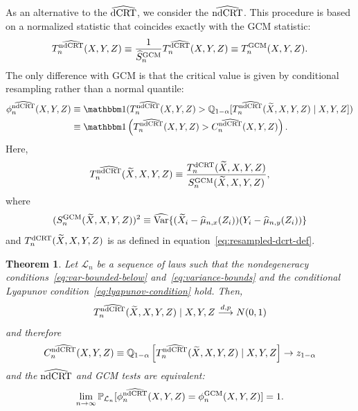 \documentclass[aos]{imsart}
\theoremstyle{plain}
\newtheorem{theorem}{Theorem}
\theoremstyle{remark}
\newcommand{\V}{\mathrm{Var}}							%
\renewcommand{\P}{\mathbb{P}}							%
\newcommand{\Q}{\mathbb{Q}}								%
\newcommand{\indicator}{\mathbbm 1}						%
\newcommand{\srx}{X}									%
\newcommand{\srz}{Z}									%
\newcommand{\srxk}{\widetilde X}						%
\newcommand{\sry}{Y}									%
\newcommand{\law}{\mathcal L}							%
\newcommand{\dCRT}{\textnormal{dCRT}} 					%
\newcommand{\GCM}{\textnormal{GCM}}						%
\newcommand{\dCRThat}{\widehat{\textnormal{dCRT}}}		%
\newcommand{\ndCRThat}{\widehat{\textnormal{ndCRT}}}	%
\newcommand{\convdp}{\overset {d,p} \longrightarrow}    %
\begin{document}
As an alternative to the $\dCRThat$, we consider the $\ndCRThat$. This procedure is based on a normalized statistic that coincides exactly with the GCM statistic:
\begin{equation*}
T^{\ndCRThat}_n(\srx,\sry,\srz) \equiv \frac{1}{\widehat S_{n}^{\GCM}}T_n^{\dCRThat}(\srx, \sry, \srz) \equiv T^{\GCM}_n(\srx, \sry, \srz).
\end{equation*}
The only difference with GCM is that the critical value is given by conditional resampling rather than a normal quantile:
\begin{equation}
	\begin{split}
		\phi^{\ndCRThat}_n(\srx, \sry, \srz) &\equiv \indicator(T_n^{\ndCRThat}(\srx, \sry, \srz) > \Q_{1-\alpha}[T_n^{\ndCRThat}(\srxk, \srx, \sry, \srz) \mid \srx, \sry, \srz]) \\
		&\equiv \indicator\left(T_n^{\ndCRThat}(\srx, \sry, \srz) > C^{\ndCRThat}_n(\srx, \sry, \srz)\right).
	\end{split}
\end{equation}
Here, 
\begin{equation*}
T_n^{\ndCRThat}(\srxk, \srx, \sry, \srz) \equiv \frac{T_n^{\dCRT}(\srxk, \srx, \sry, \srz)}{S_n^{\GCM}(\srxk, \srx, \sry, \srz)},
\end{equation*}
where 
\begin{equation*}
(S_n^{\GCM}(\srxk, \srx, \sry, \srz))^2 \equiv \widehat{\V}\{(\srxk_i - \widehat \mu_{n,x}(\srz_i))(\sry_i - \widehat \mu_{n,y}(\srz_i))\}
\end{equation*}
and $T_n^{\dCRT}(\srxk, \srx, \sry, \srz)$ is as defined in equation~\eqref{eq:resampled-dcrt-def}.

\begin{theorem}\label{thm:normal-limit-ndcrt} 
	Let $\law_n$ be a sequence of laws such that the nondegeneracy conditions~\eqref{eq:var-bounded-below} and~\eqref{eq:variance-bounds} and the conditional Lyapunov condition~\eqref{eq:lyapunov-condition} hold. Then,
	\begin{equation}
		T^{\ndCRThat}_n(\srxk, \srx, \sry,\srz) \mid \srx, \sry, \srz \convdp N(0,1)
		\label{eq:conditional-convergence-ndcrt}
	\end{equation}
	and therefore
	\begin{equation}
		C^{\ndCRThat}_n(\srx, \sry, \srz) \equiv \Q_{1-\alpha}\left[T^{\ndCRThat}_n(\srxk, \srx, \sry,\srz) \mid \srx, \sry, \srz\right] \rightarrow z_{1-\alpha}
		\label{eq:critical-value-convergence-ndcrt}
	\end{equation}
	and the $\ndCRThat$ and GCM tests are equivalent:
	\begin{equation}
	\lim_{n \rightarrow \infty} \P_{\law_n}[\phi_n^{\ndCRThat}(\srx, \sry, \srz) = \phi_n^{\GCM}(\srx, \sry, \srz)] = 1.
	\label{eq:ndcrt-gcm-equivalence}
	\end{equation}
\end{theorem}
\end{document}

